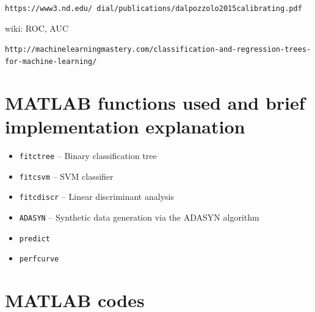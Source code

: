 \documentclass{article}
\begin{document}
\clearpage
\begin{thebibliography}{9}

\texttt{https://www3.nd.edu/~dial/publications/dalpozzolo2015calibrating.pdf}

wiki: ROC, AUC

\texttt{http://machinelearningmastery.com/classification-and-regression-trees-for-machine-learning/}

\end{thebibliography}

\begin{appendices}
\section{MATLAB functions used and brief implementation explanation}
\begin{itemize}
	\item \texttt{fitctree} -- Binary classification tree
	\item \texttt{fitcsvm} -- SVM classifier
	\item \texttt{fitcdiscr} -- Linear discriminant analysis
	\item \texttt{ADASYN} -- Synthetic data generation via the ADASYN algorithm
	\item \texttt{predict}
	\item \texttt{perfcurve}
\end{itemize}

\section{MATLAB codes}




\end{appendices}
\end{document}
